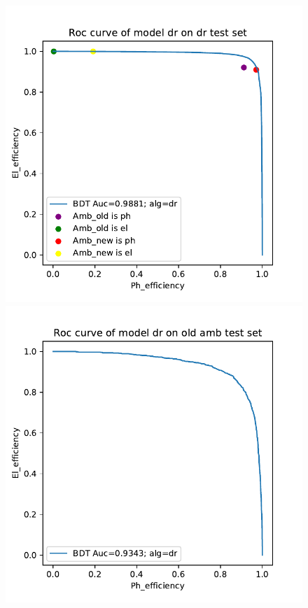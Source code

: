 \documentclass[a4paper, oneside]{book}
\begin{document}
			\begin{figure}[ht]  
				\begin{minipage}[b]{0.5\linewidth}
					\centering
					\includegraphics[width=1.\linewidth]{tesi_images/dr_dr.pdf}
					\caption{} 
					\label{fig:dr_dr}
					\vspace{4ex}
				\end{minipage}%
				\begin{minipage}[b]{0.5\linewidth}
					\centering
					\includegraphics[width=1.\linewidth]{tesi_images/dr_old.pdf} 

\end{minipage}
\end{figure}
\end{document}
